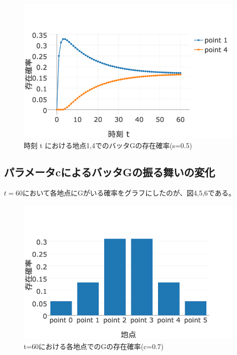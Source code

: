 \documentclass[11pt]{ltjsarticle}
\begin{document}
	\begin{figure}
  		\includegraphics[width=\textwidth]{fig3.png}
  		\caption{時刻 t における地点1,4でのバッタGの存在確率(s=0.5)}
	\end{figure}

\subsection{パラメータcによるバッタGの振る舞いの変化}
	$t=60$において各地点にGがいる確率をグラフにしたのが、図4,5,6である。

\begin{figure}
  \includegraphics[width=\textwidth]{fig4.png}
  \caption{ t=60における各地点でのGの存在確率(c=0.7)}
\end{figure}
\end{document}
